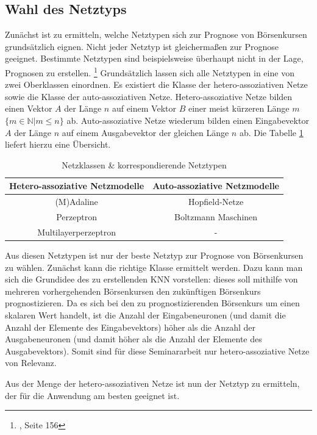 \subsection{Wahl des Netztyps}
\label{subsection:Wahl des Netztyps}
Zunächst ist zu ermitteln, welche Netztypen sich zur Prognose von Börsenkursen grundsätzlich eignen. Nicht jeder Netztyp ist gleichermaßen zur Prognose geeignet. Bestimmte Netztypen sind beispielsweise überhaupt nicht in der Lage, Prognosen zu erstellen. 
\footnote{\Vgl{}, Seite 156}
Grundsätzlich lassen sich alle Netztypen in eine von zwei Oberklassen einordnen. Es existiert die Klasse der hetero-assoziativen Netze sowie die Klasse der auto-assoziativen Netze. Hetero-assoziative Netze bilden einen Vektor $A$ der Länge $n$ auf einem Vektor $B$ einer meist kürzeren Länge $m$ $\{m \in \mathbb{N} | m \le n\}$ ab. Auto-assoziative Netze wiederum bilden einen Eingabevektor $A$ der Länge $n$ auf einem Ausgabevektor der gleichen Länge $n$ ab. Die Tabelle \ref{tab:Netztypen} liefert hierzu eine Übersicht.

\begin{table}[H]
\centering
\begin{tabular}{|c|c|}
\hline 
\textbf{Hetero-assoziative Netzmodelle} & \textbf{Auto-assoziative Netzmodelle} \\ 
\hline 
(M)Adaline & Hopfield-Netze \\ 
\hline  
Perzeptron &  Boltzmann Maschinen \\ 
\hline 
Multilayerperzeptron & - \\ 
\hline 
\end{tabular} 
\label{tab:Netztypen}
\caption{Netzklassen \& korrespondierende Netztypen}
\end{table}

Aus diesen Netztypen ist nur der beste Netztyp zur Prognose von Börsenkursen zu wählen. Zunächst kann die richtige Klasse ermittelt werden. Dazu kann man sich die Grundidee des zu erstellenden KNN vorstellen: dieses soll mithilfe von mehreren vorhergehenden Börsenkursen den zukünftigen Börsenkurs prognostizieren. Da es sich bei den zu prognostizierenden Börsenkurs um einen skalaren Wert handelt, ist die Anzahl der Eingabeneuronen (und damit die Anzahl der Elemente des Eingabevektors) höher als die Anzahl der Ausgabeneuronen (und damit höher als die Anzahl der Elemente des Ausgabevektors). Somit sind für diese Seminararbeit nur hetero-assoziative Netze von Relevanz.

Aus der Menge der hetero-assoziativen Netze ist nun der Netztyp zu ermitteln, der für die Anwendung am besten geeignet ist.


